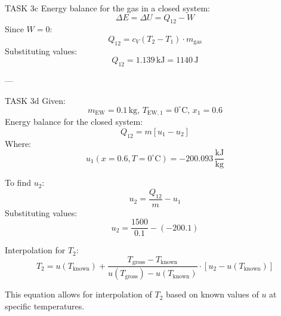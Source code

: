 TASK 3c  
Energy balance for the gas in a closed system:  
\[
\Delta E = \Delta U = Q_{12} - W
\]  
Since \( W = 0 \):  
\[
Q_{12} = c_V (T_2 - T_1) \cdot m_{\text{gas}}
\]  
Substituting values:  
\[
Q_{12} = 1.139 \, \text{kJ} = 1140 \, \text{J}
\]  

---

TASK 3d  
Given:  
\[
m_{\text{EW}} = 0.1 \, \text{kg}, \, T_{\text{EW},1} = 0^\circ\text{C}, \, x_1 = 0.6
\]  
Energy balance for the closed system:  
\[
Q_{12} = m \left[ u_1 - u_2 \right]
\]  
Where:  
\[
u_1(x = 0.6, T = 0^\circ\text{C}) = -200.093 \, \frac{\text{kJ}}{\text{kg}}
\]  

To find \( u_2 \):  
\[
u_2 = \frac{Q_{12}}{m} - u_1
\]  
Substituting values:  
\[
u_2 = \frac{1500}{0.1} - (-200.1)
\]  

Interpolation for \( T_2 \):  
\[
T_2 = u(T_{\text{known}}) + \frac{T_{\text{gross}} - T_{\text{known}}}{u(T_{\text{gross}}) - u(T_{\text{known}})} \cdot \left[ u_2 - u(T_{\text{known}}) \right]
\]  

This equation allows for interpolation of \( T_2 \) based on known values of \( u \) at specific temperatures.